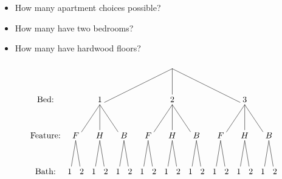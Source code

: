 \documentclass[handout]{beamer}
\theoremstyle{definition}
\begin{document}
\begin{frame}
\begin{itemize}
\item How many apartment choices possible?
\item How many have two bedrooms?
\item How many have hardwood floors?
\end{itemize}
\[\begin{xy}<.5cm,0cm>:
(8.5,0)="0";
(2.5,-3)="1";
(8.5,-3)="2";
(14.5,-3)="3";
"0";"1"*+!D{1}**\dir{-};
"0";"2"*+!D{2}**\dir{-};
"0";"3"*+!D{3}**\dir{-};
(.5,-6)="11";
(2.5,-6)="12";
(4.5,-6)="13";
(6.5,-6)="21";
(8.5,-6)="22";
(10.5,-6)="23";
(12.5,-6)="31";
(14.5,-6)="32";
(16.5,-6)="33";
"1";"11"*+!D{F}**\dir{-};
"1";"12"*+!D{H}**\dir{-};
"1";"13"*+!D{B}**\dir{-};
"2";"21"*+!D{F}**\dir{-};
"2";"22"*+!D{H}**\dir{-};
"2";"23"*+!D{B}**\dir{-};
"3";"31"*+!D{F}**\dir{-};
"3";"32"*+!D{H}**\dir{-};
"3";"33"*+!D{B}**\dir{-};
"11";(0,-9)*+!D{1}**\dir{-};
"11";(1,-9)*+!D{2}**\dir{-};
"12";(2,-9)*+!D{1}**\dir{-};
"12";(3,-9)*+!D{2}**\dir{-};
"13";(4,-9)*+!D{1}**\dir{-};
"13";(5,-9)*+!D{2}**\dir{-};
"21";(6,-9)*+!D{1}**\dir{-};
"21";(7,-9)*+!D{2}**\dir{-};
"22";(8,-9)*+!D{1}**\dir{-};
"22";(9,-9)*+!D{2}**\dir{-};
"23";(10,-9)*+!D{1}**\dir{-};
"23";(11,-9)*+!D{2}**\dir{-};
"31";(12,-9)*+!D{1}**\dir{-};
"31";(13,-9)*+!D{2}**\dir{-};
"32";(14,-9)*+!D{1}**\dir{-};
"32";(15,-9)*+!D{2}**\dir{-};
"33";(16,-9)*+!D{1}**\dir{-};
"33";(17,-9)*+!D{2}**\dir{-};
(-2,-3)*+!D{\text{Bed:}};
(-2,-6)*+!D{\text{Feature:}};
(-2,-9)*+!D{\text{Bath:}};
\end{xy}\]
\end{frame}
\end{document}
